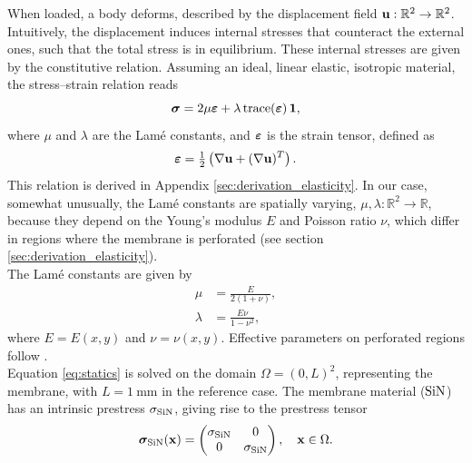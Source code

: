When loaded, a body deforms, described by the displacement field $\mathbf{u}:\mathbb{R}^2 \rightarrow \mathbb{R}^2$. Intuitively, the displacement induces internal stresses that counteract the external ones, such that the total stress is in equilibrium. These internal stresses are given by the constitutive relation. Assuming an ideal, linear elastic, isotropic material, the stress–strain relation reads
\begin{equation}
    \boldsymbol{\sigma} = 2 \mu \boldsymbol{\varepsilon} + \lambda \, \mathrm{trace}(\boldsymbol{\varepsilon})\, \mathbf{1},
\end{equation}
where $\mu$ and $\lambda$ are the Lamé constants, and $\boldsymbol{\varepsilon}$ is the strain tensor, defined as
\begin{equation}
    \boldsymbol{\varepsilon} = \tfrac{1}{2}\left(\nabla\mathbf{u} + (\nabla\mathbf{u})^T\right).
    \label{eq:strain_displacement_relation}
\end{equation}
This relation is derived in Appendix \ref{sec:derivation_elasticity}. In our case, somewhat unusually, the Lamé constants are spatially varying, $\mu,\lambda:\mathbb{R}^2 \rightarrow \mathbb{R}$, because they depend on the Young’s modulus $E$ and Poisson ratio $\nu$, which differ in regions where the membrane is perforated (see section \ref{sec:derivation_elasticity}).\\

The Lamé constants are given by
\begin{align*}
    \mu &= \frac{E}{2(1+\nu)},\\
    \lambda &= \frac{E \nu}{1-\nu^2},
\end{align*}
where $E=E(x,y)$ and $\nu=\nu(x,y)$. Effective parameters on perforated regions follow \cite{IPerf}.\\

Equation \eqref{eq:statics} is solved on the domain $\Omega = (0,L)^2$, representing the membrane, with $L= \SI{1}{\milli\meter}$ in the reference case. The membrane material ($\mathrm{SiN}$) has an intrinsic prestress $\sigma_{\mathrm{SiN}}$, giving rise to the prestress tensor
\begin{equation*}
    \boldsymbol{\sigma}_{\mathrm{SiN}} (\mathbf{x} )=  
    \begin{pmatrix}
        \sigma_{\mathrm{SiN}} & 0\\ 
        0 & \sigma_{\mathrm{SiN}}
    \end{pmatrix},
    \quad \mathbf{x} \in \Omega.
\end{equation*}

